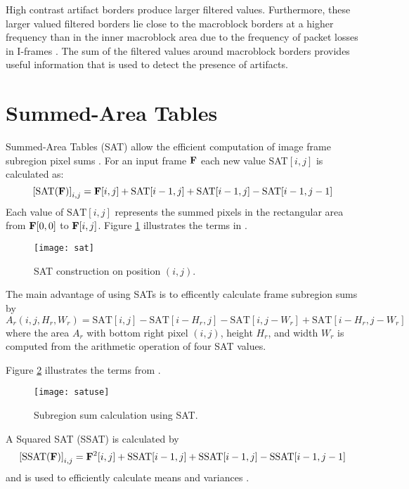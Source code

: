 High contrast artifact borders produce larger filtered values. Furthermore, these larger valued filtered borders lie close to the macroblock borders at a higher frequency than in the inner macroblock area due to the frequency of packet losses in I-frames \cite{Glavota2016, Vranjes2018}. The sum of the filtered values around macroblock borders provides useful information that is used to detect the presence of artifacts.

\section{Summed-Area Tables}
\label{sec:sat_calc}

Summed-Area Tables (SAT) allow the efficient computation of image frame subregion pixel sums \cite{Crow1984}. For an input frame $\mathbf{F}$ each new value SAT$[i,j]$ is calculated as:
%
\def\SAT{\text{SAT}}
\begin{equation}
  \label{eq:satgen}
  \left[\SAT(\mat{F})\right]_{i,j}=\mat{F}[i,j]+\SAT[i-1,j]+\SAT[i-1,j]-\SAT[i-1,j-1]
\end{equation}
%
Each value of $\SAT[i,j]$ represents the summed pixels in the rectangular area from $\mathbf{F}[0,0]$ to $\mathbf{F}[i,j]$. Figure \ref{fig:sat} illustrates the terms in .

\begin{figure} [!h]
  \centering
  \texttt{[image: sat]}
  \caption{SAT construction on position $(i,j)$.}
  \label{fig:sat}
\end{figure}

The main advantage of using SATs is to efficently calculate frame subregion sums by
%
\begin{equation}
  \label{eq:satuse}
  A_r(i,j,H_r,W_r)=\text{SAT}[i,j]-\text{SAT}[i-H_r,j]-\text{SAT}[i,j-W_r]+\text{SAT}[i-H_r,j-W_r]
\end{equation}
%
where the area $A_r$ with bottom right pixel $(i,j)$, height $H_r$, and width $W_r$ is computed from the arithmetic operation of four SAT values.

Figure \ref{fig:satuse} illustrates the terms from .
\begin{figure} [!h]
  \centering
  \texttt{[image: satuse]}
  \caption{Subregion sum calculation using SAT.}
  \label{fig:satuse}
\end{figure}

A Squared SAT (SSAT) is calculated by
%
\def\SSAT{\text{SSAT}}
\begin{equation}
  \label{eq:ssat}
  \left[\SSAT(\mat{F})\right]_{i,j}=\mat{F}^2[i,j]+\SSAT[i-1,j]+\SSAT[i-1,j]-\SSAT[i-1,j-1]
\end{equation}
%
and is used to efficiently calculate means and variances \cite{Crow1984}.

